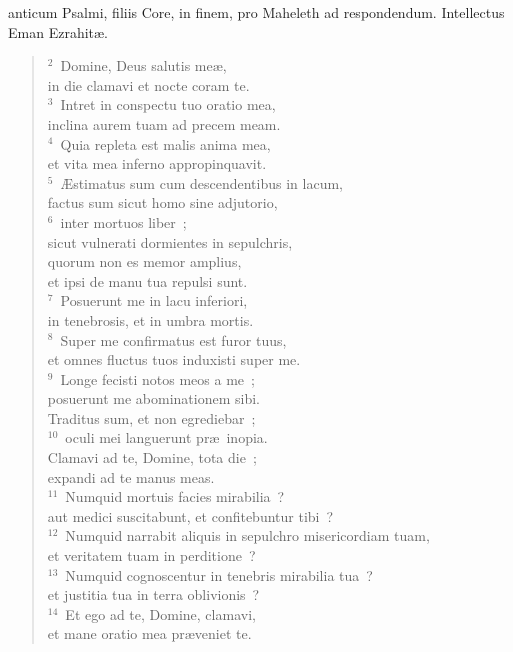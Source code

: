 \bchapter
{}anticum Psalmi, filiis Core, in finem, pro Maheleth ad respondendum. Intellectus Eman Ezrahit\ae .
\begin{flushleft}\begin{verse}\vspace{6pt}${}^{2}$~Domine, Deus salutis me\ae ,\\ in die clamavi et nocte coram te.\\
${}^{3}$~Intret in conspectu tuo oratio mea,\\ inclina aurem tuam ad precem meam.\\
${}^{4}$~Quia repleta est malis anima mea,\\ et vita mea inferno appropinquavit.\\
${}^{5}$~\AE stimatus sum cum descendentibus in lacum,\\ factus sum sicut homo sine adjutorio,\\
${}^{6}$~inter mortuos liber~;\\ sicut vulnerati dormientes in sepulchris,\\ quorum non es memor amplius,\\ et ipsi de manu tua repulsi sunt.\\
${}^{7}$~Posuerunt me in lacu inferiori,\\ in tenebrosis, et in umbra mortis.\\
${}^{8}$~Super me confirmatus est furor tuus,\\ et omnes fluctus tuos induxisti super me.\\
${}^{9}$~Longe fecisti notos meos a me~;\\ posuerunt me abominationem sibi.\\ Traditus sum, et non egrediebar~;\\
${}^{10}$~oculi mei languerunt pr\ae\ inopia.\\ Clamavi ad te, Domine, tota die~;\\ expandi ad te manus meas.\\
${}^{11}$~Numquid mortuis facies mirabilia~?\\ aut medici suscitabunt, et confitebuntur tibi~?\\
${}^{12}$~Numquid narrabit aliquis in sepulchro misericordiam tuam,\\ et veritatem tuam in perditione~?\\
${}^{13}$~Numquid cognoscentur in tenebris mirabilia tua~?\\ et justitia tua in terra oblivionis~?\\
${}^{14}$~Et ego ad te, Domine, clamavi,\\ et mane oratio mea pr\ae veniet te.\\

\end{verse}
\end{flushleft}
